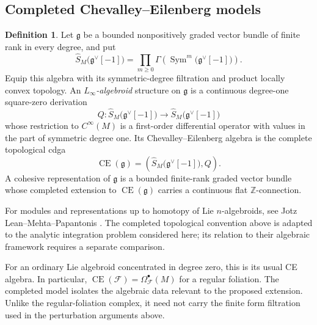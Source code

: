 \documentclass[12pt]{amsart}
\theoremstyle{definition}
\newtheorem{defn}[thm]{Definition}
\theoremstyle{remark}
\numberwithin{equation}{section}
\newcommand{\CF}{{\mathcal F}}
\newcommand{\Z}{{\mathbb{Z}}}
\newcommand{\1}{{\mathbb{1}}}
\newcommand{\CE}{\operatorname{CE}}
\begin{document}
\subsection{Completed Chevalley--Eilenberg models}

\begin{defn}\label{def:linfty-algebroid}
Let $\mathfrak g$ be a bounded nonpositively graded vector bundle of
finite rank in every degree, and put
\[
 \widehat S_M\bigl(\mathfrak g^\vee[-1]\bigr)
 =
 \prod_{m\geq0}
 \Gamma\left(
 \operatorname{Sym}^m
 \bigl(\mathfrak g^\vee[-1]\bigr)\right).
\]
Equip this algebra with its symmetric-degree filtration and product
locally convex topology.  An \emph{$L_\infty$-algebroid} structure
on $\mathfrak g$ is a continuous degree-one square-zero derivation
\[
 Q:\widehat S_M\bigl(\mathfrak g^\vee[-1]\bigr)
 \longrightarrow
 \widehat S_M\bigl(\mathfrak g^\vee[-1]\bigr)
\]
whose restriction to $C^\infty(M)$ is a first-order differential
operator with values in the part of symmetric degree one.  Its
Chevalley--Eilenberg algebra is the complete topological cdga
\[
 \CE(\mathfrak g)
 =
 \left(\widehat S_M
 \bigl(\mathfrak g^\vee[-1]\bigr),Q\right).
\]
A cohesive representation of $\mathfrak g$ is a bounded finite-rank
graded vector bundle whose completed extension to
$\CE(\mathfrak g)$ carries a continuous flat $\Z$-connection.
\end{defn}

For modules and representations up to homotopy of Lie
$n$-algebroids, see Jotz Lean--Mehta--Papantonis \cite{JMP23}.  The
completed topological convention above is adapted to the analytic
integration problem considered here; its relation to their algebraic
framework requires a separate comparison.

For an ordinary Lie algebroid concentrated in degree zero, this is its
usual CE algebra.  In particular,
$\CE(\CF)=\Omega^\bullet_{\CF}(M)$ for a regular foliation.  The
completed model isolates the algebraic data relevant to the proposed
extension.  Unlike the regular-foliation complex, it need not carry
the finite form filtration used in the perturbation arguments above.
\end{document}
